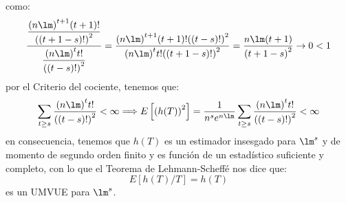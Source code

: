 \begin{ejercicio}
    como:
    \begin{equation*}
        \dfrac{\dfrac{{(n\lm)}^{t+1}(t+1)!}{{((t+1-s)!)}^{2}}}{\dfrac{{(n\lm)}^{t}t!}{{((t-s)!)}^{2}}} = \dfrac{{(n\lm)}^{t+1}(t+1)!{((t-s)!)}^{2}}{{(n\lm)}^{t}t!{((t+1-s)!)}^{2}} = \dfrac{n\lm(t+1)}{{(t+1-s)}^{2}} \to 0 < 1
    \end{equation*}
    por el Criterio del cociente, tenemos que:
    \begin{equation*}
        \sum_{t\geq s} \dfrac{{(n\lm)}^{t}t!}{{((t-s)!)}^{2}} < \infty \Longrightarrow E\left[{(h(T))}^{2}\right]  =\dfrac{1}{n^s e^{n\lm}}\sum_{t\geq s} \dfrac{{(n\lm)}^{t}t!}{{((t-s)!)}^{2}}   < \infty
    \end{equation*}
    en consecuencia, tenemos que $h(T)$ es un estimador insesgado para $\lm^s$ y de momento de segundo orden finito y es función de un estadístico suficiente y completo, con lo que el Teorema de Lehmann-Scheffé nos dice que:
    \begin{equation*}
        E[h(T)/T] = h(T)
    \end{equation*}
    es un UMVUE para $\lm^s$.
\end{ejercicio}

